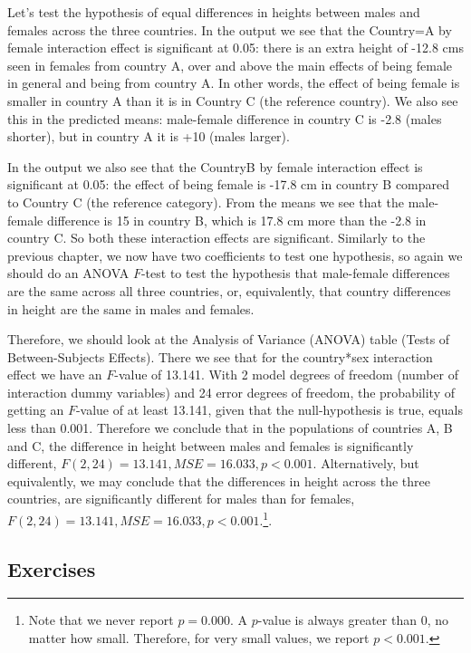 Let's test the hypothesis of equal differences in heights between males and females across the three countries. In the output we see that the Country=A by female interaction effect is significant at 0.05: there is an extra height of -12.8 cms seen in females from country A, over and above the main effects of being female in general and being from country A. In other words, the effect of being female is smaller in country A than it is in Country C (the reference country). We also see this in the predicted means: male-female difference in country C is -2.8 (males shorter), but in country A it is +10 (males larger). 

In the output we also see that the CountryB by female interaction effect is significant at 0.05: the effect of being female is -17.8 cm in country B compared to Country C (the reference category). From the means we see that the male-female difference is 15 in country B, which is 17.8 cm more than the -2.8 in country C. So both these interaction effects are significant. Similarly to the previous chapter, we now have two coefficients to test one hypothesis, so again we should do an ANOVA $F$-test to test the hypothesis that male-female differences are the same across all three countries, or, equivalently, that country differences in height are the same in males and females.


Therefore, we should look at the Analysis of Variance (ANOVA) table (Tests of Between-Subjects Effects). There we see that for the country*sex interaction effect we have an $F$-value of 13.141. With 2 model degrees of freedom (number of interaction dummy variables) and 24 error degrees of freedom, the probability of getting an $F$-value of at least 13.141, given that the null-hypothesis is true, equals less than 0.001. Therefore we conclude that in the populations of countries A, B and C, the difference in height between males and females is significantly different, $F(2, 24)=13.141, MSE=16.033, p < 0.001$. Alternatively, but equivalently, we may conclude that the differences in height across the three countries, are significantly different for males than for females, $F(2, 24)=13.141, MSE=16.033, p < 0.001$.\footnote{Note that we never report $p=0.000$. A $p$-value is always greater than 0, no matter how small. Therefore, for very small values, we report $p < 0.001$.}. 



\subsection{Exercises}

